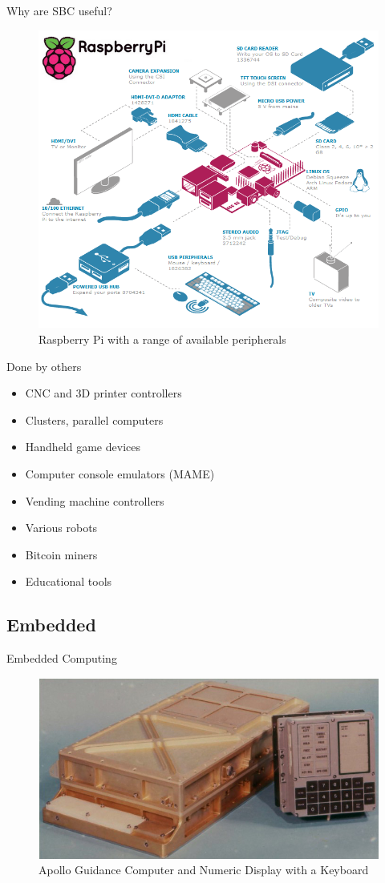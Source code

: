 \documentclass[hyperref={unicode}]{beamer}
\begin{document}
\begin{frame}{Why are SBC useful?}
\begin{figure}
\includegraphics[width=.7\textwidth]{raspi-peripherals.png}
\caption{Raspberry Pi with a range of available peripherals}
\end{figure}
\end{frame}


\begin{frame}{Done by others}
	\begin{itemize}
	\item CNC and 	3D printer controllers
	\item Clusters, parallel computers
	\item Handheld game devices
	\item Computer console emulators (MAME)
	\item Vending machine controllers
	\item Various robots
	\item Bitcoin miners
	\item Educational tools
	\end{itemize}
\end{frame}



\subsection{Embedded}

\begin{frame}{Embedded Computing}
	\begin{figure}
	\includegraphics[width=.8\textwidth]{apollo-guidance.jpg}
	\caption{Apollo Guidance Computer and Numeric Display with a Keyboard}
	\end{figure}
\end{frame}
\end{document}
